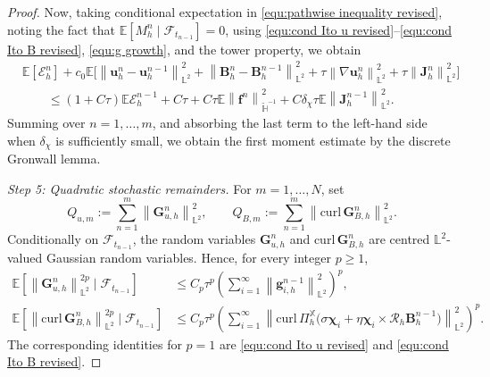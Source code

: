 \documentclass[11pt, reqno]{amsart}
\theoremstyle{definition}
\numberwithin{equation}{section}
\newcommand{\curl}{\mathrm{curl}\,}
\newcommand{\bff}{\boldsymbol}
\newcommand{\bb}{\mathbb}
\newcommand{\norm}[2]{\left\|{#1}\right\|_{#2}}
\begin{document}
\begin{proof}
	
	Now, taking conditional expectation in \eqref{equ:pathwise inequality revised}, noting the fact that $\bb E[M_h^n\mid\mathscr F_{t_{n-1}}]=0$, using \eqref{equ:cond Ito u revised}--\eqref{equ:cond Ito B revised}, \eqref{equ:g growth}, and the tower property, we obtain
	\begin{align}\label{equ:first moment one step revised}
		&\bb E \left[\mathcal E_h^n\right]
		+
		c_0\bb E\Big[
		\norm{\bff u_h^n-\bff u_h^{n-1}}{\bb L^2}^2
		+
		\norm{\bff B_h^n-\bff B_h^{n-1}}{\bb L^2}^2
		+
		\tau\norm{\nabla\bff u_h^n}{\bb L^2}^2
		+
		\tau\norm{\bff J_h^n}{\bb L^2}^2
		\Big]
		\nonumber\\
		&\qquad
		\le
		(1+C\tau)\bb E\mathcal E_h^{n-1}
		+
		C\tau
		+
		C\tau\bb E\norm{\bff f^n}{\widetilde{\bb H}^{-1}}^2
		+
		C\delta_\chi\tau\bb E\norm{\bff J_h^{n-1}}{\bb L^2}^2.
	\end{align}
	Summing over $n=1,\ldots,m$, and absorbing the last term to the left-hand side when $\delta_\chi$ is sufficiently small, we obtain the first moment estimate by the discrete Gronwall lemma.
	
	
	\emph{Step 5: Quadratic stochastic remainders.}
	For $m=1,\ldots,N$, set
	\[
	Q_{u,m}
	:=
	\sum_{n=1}^{m}
	\norm{\bff G_{u,h}^n}{\bb L^2}^2,
	\qquad
	Q_{B,m}
	:=
	\sum_{n=1}^{m}
	\norm{\curl\bff G_{B,h}^n}{\bb L^2}^2.
	\]
	Conditionally on $\mathscr F_{t_{n-1}}$, the random variables
	$\bff G_{u,h}^n$ and $\curl\bff G_{B,h}^n$ are centred
	$\bb L^2$-valued Gaussian random variables. Hence, for every integer
	$p\ge1$,
	\begin{align}
		\label{equ:conditional Gaussian Gu}
		\bb E\left[
		\norm{\bff G_{u,h}^n}{\bb L^2}^{2p}
		\mid\mathscr F_{t_{n-1}}
		\right]
		&\le
		C_p\tau^p
		\left(
		\sum_{i=1}^{\infty}
		\norm{\bff g_{i,h}^{n-1}}{\bb L^2}^2
		\right)^p,
		\\
		\label{equ:conditional Gaussian GB}
		\bb E\left[
		\norm{\curl\bff G_{B,h}^n}{\bb L^2}^{2p}
		\mid\mathscr F_{t_{n-1}}
		\right]
		&\le
		C_p\tau^p
		\left(
		\sum_{i=1}^{\infty}
		\norm{
			\curl\Pi_h^{\bb X}
			\bigl(
			\sigma\bff\chi_i
			+
			\eta\bff\chi_i\times\mathcal R_h\bff B_h^{n-1}
			\bigr)}
		{\bb L^2}^2
		\right)^p.
	\end{align}
	The corresponding identities for $p=1$ are
	\eqref{equ:cond Ito u revised} and \eqref{equ:cond Ito B revised}.
	

\end{proof}
\end{document}
